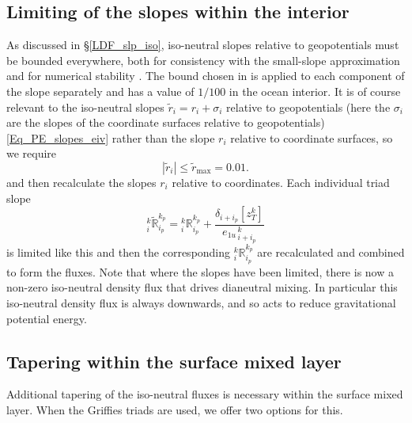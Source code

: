 \subsection{ Limiting of the slopes within the interior}\label{sec:triad:limit}
As discussed in \S\ref{LDF_slp_iso}, iso-neutral slopes relative to
geopotentials must be bounded everywhere, both for consistency with the small-slope
approximation and for numerical stability \citep{Cox1987,
  Griffies_Bk04}. The bound chosen in \NEMO is applied to each
component of the slope separately and has a value of $1/100$ in the ocean interior.
It is of course relevant to the iso-neutral slopes $\tilde{r}_i=r_i+\sigma_i$ relative to
geopotentials (here the $\sigma_i$ are the slopes of the coordinate surfaces relative to
geopotentials) \eqref{Eq_PE_slopes_eiv} rather than the slope $r_i$ relative to coordinate
surfaces, so we require
\begin{equation*}
  |\tilde{r}_i|\leq \tilde{r}_\mathrm{max}=0.01.
\end{equation*}
and then recalculate the slopes $r_i$ relative to coordinates.
Each individual triad slope
 \begin{equation}
   \label{eq:triad:Rtilde}
_i^k\tilde{\mathbb{R}}_{i_p}^{k_p} = {}_i^k\mathbb{R}_{i_p}^{k_p}  + \frac{\delta_{i+i_p}[z_T^k]}{{e_{1u}}_{\,i + i_p}^{\,k}}
 \end{equation}
is limited like this and then the corresponding
$_i^k\mathbb{R}_{i_p}^{k_p} $ are recalculated and combined to form the fluxes.
Note that where the slopes have been limited, there is now a non-zero
iso-neutral density flux that drives dianeutral mixing.  In particular this iso-neutral density flux
is always downwards, and so acts to reduce gravitational potential energy.
\subsection{Tapering within the surface mixed layer}\label{sec:triad:taper}

Additional tapering of the iso-neutral fluxes is necessary within the
surface mixed layer. When the Griffies triads are used, we offer two
options for this.
